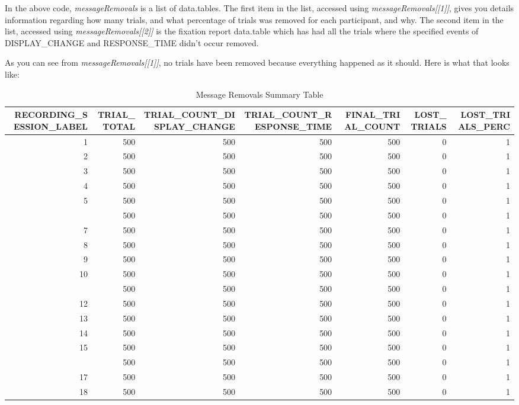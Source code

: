 \documentclass[]{book}
\begin{document}
In the above code, \emph{messageRemovals} is a list of data.tables. The first item in the list, accessed using \emph{messageRemovals{[}{[}1{]}{]}}, gives you details information regarding how many trials, and what percentage of trials was removed for each participant, and why. The second item in the list, accessed using \emph{messageRemovals{[}{[}2{]}{]}} is the fixation report data.table which has had all the trials where the specified events of DISPLAY\_CHANGE and RESPONSE\_TIME didn't occur removed.

As you can see from \emph{messageRemovals{[}{[}1{]}{]}}, no trials have been removed because everything happened as it should. Here is what that looks like:

\begin{table}[t]

\caption{\label{tab:unnamed-chunk-37}Message Removals Summary Table}
\centering
\fontsize{8}{10}\selectfont
\begin{tabular}{rrrrrrr}
\toprule
RECORDING\_SESSION\_LABEL & TRIAL\_TOTAL & TRIAL\_COUNT\_DISPLAY\_CHANGE & TRIAL\_COUNT\_RESPONSE\_TIME & FINAL\_TRIAL\_COUNT & LOST\_TRIALS & LOST\_TRIALS\_PERC\\
\midrule
1 & 500 & 500 & 500 & 500 & 0 & 1\\
2 & 500 & 500 & 500 & 500 & 0 & 1\\
3 & 500 & 500 & 500 & 500 & 0 & 1\\
4 & 500 & 500 & 500 & 500 & 0 & 1\\
5 & 500 & 500 & 500 & 500 & 0 & 1\\
\addlinespace
6 & 500 & 500 & 500 & 500 & 0 & 1\\
7 & 500 & 500 & 500 & 500 & 0 & 1\\
8 & 500 & 500 & 500 & 500 & 0 & 1\\
9 & 500 & 500 & 500 & 500 & 0 & 1\\
10 & 500 & 500 & 500 & 500 & 0 & 1\\
\addlinespace
11 & 500 & 500 & 500 & 500 & 0 & 1\\
12 & 500 & 500 & 500 & 500 & 0 & 1\\
13 & 500 & 500 & 500 & 500 & 0 & 1\\
14 & 500 & 500 & 500 & 500 & 0 & 1\\
15 & 500 & 500 & 500 & 500 & 0 & 1\\
\addlinespace
16 & 500 & 500 & 500 & 500 & 0 & 1\\
17 & 500 & 500 & 500 & 500 & 0 & 1\\
18 & 500 & 500 & 500 & 500 & 0 & 1\\

\end{tabular}
\end{table}
\end{document}
